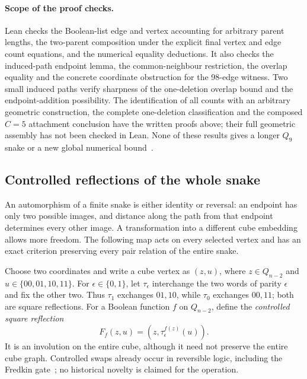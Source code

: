 \documentclass[11pt,a4paper]{article}
\theoremstyle{definition}
\theoremstyle{remark}
\begin{document}
\paragraph{Scope of the proof checks.}
Lean checks the Boolean-list edge and vertex accounting for arbitrary
parent lengths, the two-parent composition under the explicit final
vertex and edge count equations, and the numerical equality deductions.
It also checks the induced-path endpoint lemma, the common-neighbour
restriction, the overlap equality and the concrete coordinate obstruction
for the 98-edge witness. Two small induced paths verify sharpness of
the one-deletion overlap bound and the endpoint-addition possibility.
The identification of all counts with an arbitrary geometric
construction, the complete one-deletion classification and the composed
$C=5$ attachment conclusion have the written proofs above; their full
geometric assembly has not been checked in Lean. None of these results
gives a longer $Q_9$ snake or a new global numerical bound~\cite{research201}.


\subsection{Controlled reflections of the whole snake}
\label{sec:controlled202}
An automorphism of a finite snake is either identity
or reversal: an endpoint has only two possible images, and distance
along the path from that endpoint determines every other image.
A transformation into a different cube embedding allows more freedom.
The following map acts on every selected vertex and has an exact
criterion preserving every pair relation of the entire snake.

Choose two coordinates and write a cube vertex as $(z,u)$, where
$z\in Q_{n-2}$ and $u\in\{00,01,10,11\}$. For
$\epsilon\in\{0,1\}$, let $\tau_\epsilon$ interchange the two
words of parity $\epsilon$ and fix the other two. Thus $\tau_1$
exchanges $01,10$, while $\tau_0$ exchanges $00,11$; both are square
reflections. For a Boolean function $f$ on $Q_{n-2}$, define the
\emph{controlled square reflection}
\[
F_f(z,u)=(z,\tau_\epsilon^{f(z)}(u)).
\]
It is an involution on the entire cube, although it need not preserve
the entire cube graph. Controlled swaps already occur in reversible
logic, including the Fredkin gate~\cite{fredkin}; no historical novelty
is claimed for the operation.
\end{document}
